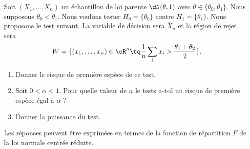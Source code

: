 \begin{example}
    
    Soit \( (X_1,\ldots,X_n)\) un échantillon de loi parente \( \dN(\theta,1)\) avec \( \theta\in\{ \theta_0,\theta_1 \}\). Nous supposons \( \theta_0<\theta_1\). Nous voulons tester \( H_0=\{ \theta_0 \}\) contre \( H_1=\{ \theta_1 \}\). Nous proposons le test suivant. La variable de décision sera \( \bar X_n\) et la région de rejet sera
    \begin{equation}
        W=\{ (x_1,\ldots,x_n)\in\eR^n\tq\frac{1}{ n }\sum_ix_i>\frac{ \theta_1+\theta_2 }{ 2 } \}.
    \end{equation}
    
    \begin{enumerate}
        \item
            Donner le risque de première espèce de ce test.
        \item
            Soit \( 0<\alpha<1\). Pour quelle valeur de \( n\) le tests a-t-il un risque de première espèce égal à \( \alpha\) ?
        \item
            Donner la puissance du test.
    \end{enumerate}
    Les réponses peuvent être exprimées en termes de la fonction de répartition \( F\) de la loi normale centrée réduite.


\end{example}
